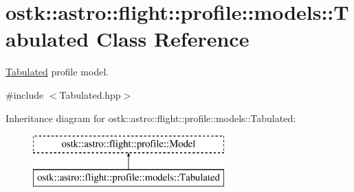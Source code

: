 \hypertarget{classostk_1_1astro_1_1flight_1_1profile_1_1models_1_1_tabulated}{}\section{ostk\+:\+:astro\+:\+:flight\+:\+:profile\+:\+:models\+:\+:Tabulated Class Reference}
\label{classostk_1_1astro_1_1flight_1_1profile_1_1models_1_1_tabulated}


\hyperlink{classostk_1_1astro_1_1flight_1_1profile_1_1models_1_1_tabulated}{Tabulated} profile model.  




{\ttfamily \#include $<$Tabulated.\+hpp$>$}

Inheritance diagram for ostk\+:\+:astro\+:\+:flight\+:\+:profile\+:\+:models\+:\+:Tabulated\+:\begin{figure}[H]
\begin{center}
\leavevmode
\includegraphics[height=2.000000cm]{classostk_1_1astro_1_1flight_1_1profile_1_1models_1_1_tabulated}
\end{center}
\end{figure}
